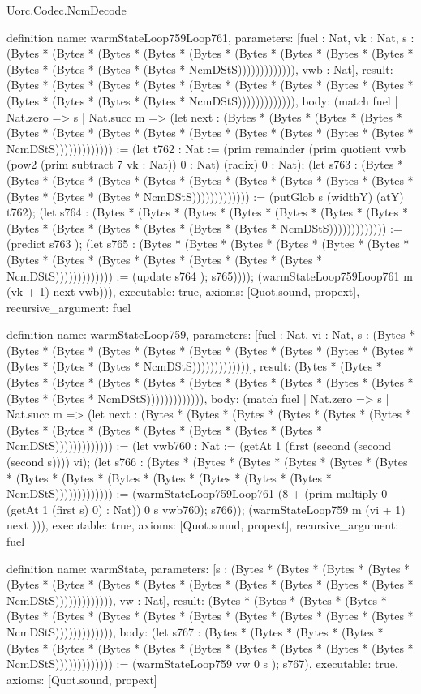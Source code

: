 \begin{lexlean}{Uorc.Codec.NcmDecode}
\begin{semanticmodule}
definition{
  name: warmStateLoop759Loop761,
  parameters: [fuel : Nat, vk : Nat, s : (Bytes * (Bytes * (Bytes * (Bytes * (Bytes * (Bytes * (Bytes * (Bytes * (Bytes * (Bytes * (Bytes * (Bytes * (Bytes * NcmDStS))))))))))))), vwb : Nat],
  result: (Bytes * (Bytes * (Bytes * (Bytes * (Bytes * (Bytes * (Bytes * (Bytes * (Bytes * (Bytes * (Bytes * (Bytes * (Bytes * NcmDStS))))))))))))),
  body: (match fuel
    | Nat.zero => s
    | Nat.succ m => (let next : (Bytes * (Bytes * (Bytes * (Bytes * (Bytes * (Bytes * (Bytes * (Bytes * (Bytes * (Bytes * (Bytes * (Bytes * (Bytes * NcmDStS))))))))))))) := (let t762 : Nat := (prim remainder (prim quotient vwb (pow2 (prim subtract 7 vk : Nat)) 0 : Nat) (radix) 0 : Nat); (let s763 : (Bytes * (Bytes * (Bytes * (Bytes * (Bytes * (Bytes * (Bytes * (Bytes * (Bytes * (Bytes * (Bytes * (Bytes * (Bytes * NcmDStS))))))))))))) := (putGlob s (widthY) (atY) t762); (let s764 : (Bytes * (Bytes * (Bytes * (Bytes * (Bytes * (Bytes * (Bytes * (Bytes * (Bytes * (Bytes * (Bytes * (Bytes * (Bytes * NcmDStS))))))))))))) := (predict s763 ); (let s765 : (Bytes * (Bytes * (Bytes * (Bytes * (Bytes * (Bytes * (Bytes * (Bytes * (Bytes * (Bytes * (Bytes * (Bytes * (Bytes * NcmDStS))))))))))))) := (update s764 ); s765)))); (warmStateLoop759Loop761 m (vk + 1) next vwb))),
  executable: true,
  axioms: [Quot.sound, propext],
  recursive_argument: fuel
}

definition{
  name: warmStateLoop759,
  parameters: [fuel : Nat, vi : Nat, s : (Bytes * (Bytes * (Bytes * (Bytes * (Bytes * (Bytes * (Bytes * (Bytes * (Bytes * (Bytes * (Bytes * (Bytes * (Bytes * NcmDStS)))))))))))))],
  result: (Bytes * (Bytes * (Bytes * (Bytes * (Bytes * (Bytes * (Bytes * (Bytes * (Bytes * (Bytes * (Bytes * (Bytes * (Bytes * NcmDStS))))))))))))),
  body: (match fuel
    | Nat.zero => s
    | Nat.succ m => (let next : (Bytes * (Bytes * (Bytes * (Bytes * (Bytes * (Bytes * (Bytes * (Bytes * (Bytes * (Bytes * (Bytes * (Bytes * (Bytes * NcmDStS))))))))))))) := (let vwb760 : Nat := (getAt 1 (first (second (second (second s)))) vi); (let s766 : (Bytes * (Bytes * (Bytes * (Bytes * (Bytes * (Bytes * (Bytes * (Bytes * (Bytes * (Bytes * (Bytes * (Bytes * (Bytes * NcmDStS))))))))))))) := (warmStateLoop759Loop761 (8 + (prim multiply 0 (getAt 1 (first s) 0) : Nat)) 0 s vwb760); s766)); (warmStateLoop759 m (vi + 1) next ))),
  executable: true,
  axioms: [Quot.sound, propext],
  recursive_argument: fuel
}

definition{
  name: warmState,
  parameters: [s : (Bytes * (Bytes * (Bytes * (Bytes * (Bytes * (Bytes * (Bytes * (Bytes * (Bytes * (Bytes * (Bytes * (Bytes * (Bytes * NcmDStS))))))))))))), vw : Nat],
  result: (Bytes * (Bytes * (Bytes * (Bytes * (Bytes * (Bytes * (Bytes * (Bytes * (Bytes * (Bytes * (Bytes * (Bytes * (Bytes * NcmDStS))))))))))))),
  body: (let s767 : (Bytes * (Bytes * (Bytes * (Bytes * (Bytes * (Bytes * (Bytes * (Bytes * (Bytes * (Bytes * (Bytes * (Bytes * (Bytes * NcmDStS))))))))))))) := (warmStateLoop759 vw 0 s ); s767),
  executable: true,
  axioms: [Quot.sound, propext]
}


\end{semanticmodule}
\end{lexlean}

